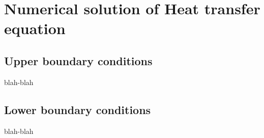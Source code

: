 \documentclass{report}
\begin{document}
\section{Numerical solution of Heat transfer equation}

\subsection{Upper boundary conditions}

blah-blah

\subsection{Lower boundary conditions}

blah-blah


%
%



%
%
%




%
%


%


\end{document}

